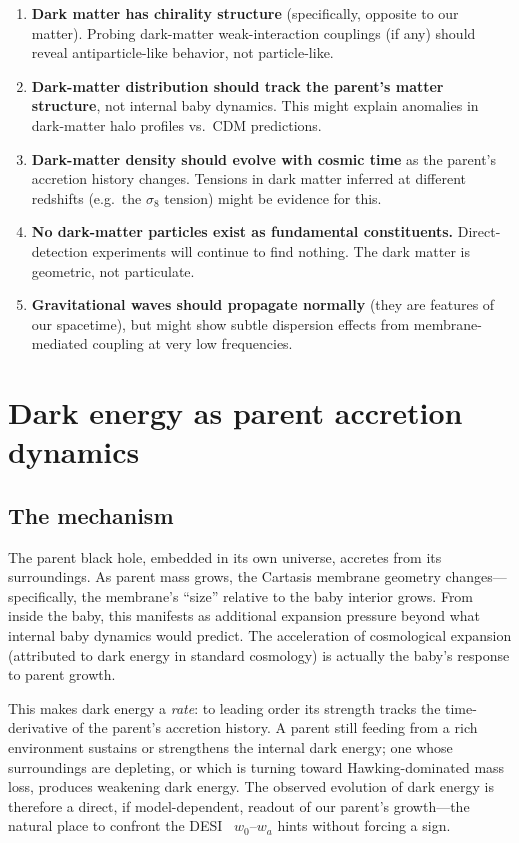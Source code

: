 \begin{enumerate}
  \item \textbf{Dark matter has chirality structure} (specifically, opposite to
    our matter). Probing dark-matter weak-interaction couplings (if any) should
    reveal antiparticle-like behavior, not particle-like.
  \item \textbf{Dark-matter distribution should track the parent's matter
    structure}, not internal baby dynamics. This might explain anomalies in
    dark-matter halo profiles vs.\ CDM predictions.
  \item \textbf{Dark-matter density should evolve with cosmic time} as the
    parent's accretion history changes. Tensions in dark matter inferred at
    different redshifts (e.g.\ the $\sigma_8$ tension) might be evidence for this.
  \item \textbf{No dark-matter particles exist as fundamental constituents.}
    Direct-detection experiments will continue to find nothing. The dark matter
    is geometric, not particulate.
  \item \textbf{Gravitational waves should propagate normally} (they are features
    of our spacetime), but might show subtle dispersion effects from
    membrane-mediated coupling at very low frequencies.
\end{enumerate}

\section{Dark energy as parent accretion dynamics}

\subsection{The mechanism}

The parent black hole, embedded in its own universe, accretes from its
surroundings. As parent mass grows, the Cartasis membrane geometry changes---
specifically, the membrane's ``size'' relative to the baby interior grows. From
inside the baby, this manifests as additional expansion pressure beyond what
internal baby dynamics would predict. The acceleration of cosmological expansion
(attributed to dark energy in standard cosmology) is actually the baby's response
to parent growth.

This makes dark energy a \emph{rate}: to leading order its strength tracks the
time-derivative of the parent's accretion history. A parent still feeding from a
rich environment sustains or strengthens the internal dark energy; one whose
surroundings are depleting, or which is turning toward Hawking-dominated mass
loss, produces weakening dark energy. The observed evolution of dark energy is
therefore a direct, if model-dependent, readout of our parent's growth---the
natural place to confront the DESI~\citep{desi2024} $w_0$--$w_a$ hints without
forcing a sign.

